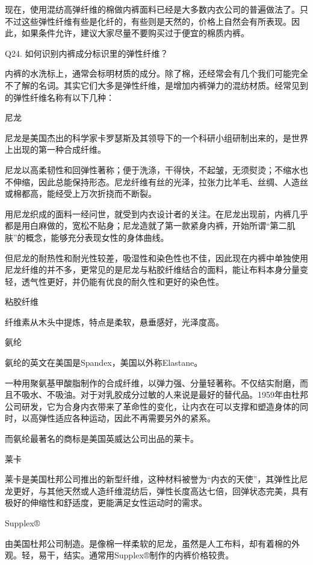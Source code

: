 \documentclass[12pt,UTF8]{ctexbook}
\begin{document}
现在，使用混纺高弹纤维的棉做内裤面料已经是大多数内衣公司的普遍做法了。只不过这些弹性纤维有些是化纤的，有些则是天然的，价格上自然会有所表现。因此，如果条件允许，建议大家尽量不要购买过于便宜的棉质内裤。





Q24. 如何识别内裤成分标识里的弹性纤维？


内裤的水洗标上，通常会标明材质的成分。除了棉，还经常会有几个我们可能完全不了解的名词。其实它们大多是弹性纤维，是增加内裤弹力的混纺材质。经常见到的弹性纤维名称有以下几种：

尼龙

尼龙是美国杰出的科学家卡罗瑟斯及其领导下的一个科研小组研制出来的，是世界上出现的第一种合成纤维。

尼龙以高柔韧性和回弹性著称；便于洗涤，干得快，不起皱，无须熨烫；不缩水也不伸缩，因此总能保持形态。尼龙纤维有丝的光泽，拉张力比羊毛、丝绸、人造丝或棉都高，能经受上万次折挠而不断裂。

用尼龙织成的面料一经问世，就受到内衣设计者的关注。在尼龙出现前，内裤几乎都是用白麻做的，宽松不贴身；尼龙造就了第一款紧身内裤，开始所谓“第二肌肤”的概念，能够充分表现女性的身体曲线。

但尼龙的耐热性和耐光性较差，吸湿性和染色性也不佳，因此现在内裤中单独使用尼龙纤维的并不多，更常见的是尼龙与粘胶纤维结合的面料，能让布料本身分量变轻，透气性更好，并仍能有优良的耐久性和更好的染色性。

粘胶纤维

纤维素从木头中提炼，特点是柔软，悬垂感好，光泽度高。

氨纶

氨纶的英文在美国是Spandex，美国以外称Elastane。

一种用聚氨基甲酸脂制作的合成纤维，以弹力强、分量轻著称。不仅结实耐磨，而且不吸水、不吸油。对于对乳胶成分过敏的人来说是最好的替代品。1959年由杜邦公司研发，它为合身内衣带来了革命性的变化，让内衣在可以支撑和塑造身体的同时，以高弹性适应各种运动，因此不再需要另外的紧系。

而氨纶最著名的商标是美国英威达公司出品的莱卡。

莱卡

莱卡是美国杜邦公司推出的新型纤维，这种材料被誉为“内衣的天使”，其弹性比尼龙更好，与其他天然或人造纤维混纺后，弹性长度高达七倍，回弹状态完美，具有极好的伸缩性和舒适度，更能满足女性运动时的需求。

Supplex®

由美国杜邦公司制造。是像棉一样柔软的尼龙，虽然是人工布料，却有着棉的外观。轻，易干，结实。通常用Supplex®制作的内裤价格较贵。
\end{document}
